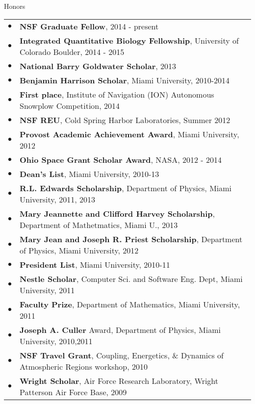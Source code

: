 \documentclass{resume} %
\begin{document}
\begin{rSection}{Honors}
  \begin{tabular}{ll}
    $\bullet$ & \textbf{NSF Graduate Fellow}, 2014 - present\\
    $\bullet$ & \textbf{Integrated Quantitative Biology Fellowship}, University of Colorado Boulder, 2014 - 2015\\
    $\bullet$ & \textbf{National Barry Goldwater Scholar}, 2013\\
    $\bullet$ & \textbf{Benjamin Harrison Scholar}, Miami University, 2010-2014\\
    $\bullet$ & \textbf{First place}, Institute of Navigation (ION) Autonomous Snowplow Competition, 2014\\
    $\bullet$ & \textbf{NSF REU}, Cold Spring Harbor Laboratories, Summer 2012\\
    $\bullet$ & \textbf{Provost Academic Achievement Award}, Miami University, 2012\\
    $\bullet$ & \textbf{Ohio Space Grant Scholar Award}, NASA, 2012 - 2014\\
    $\bullet$ & \textbf{Dean's List}, Miami University, 2010-13\\
    $\bullet$ & \textbf{R.L. Edwards Scholarship}, Department of Physics, Miami University, 2011, 2013\\
    $\bullet$ & \textbf{Mary Jeannette and Clifford Harvey Scholarship}, Department of Mathetmatics, Miami U., 2013\\
    $\bullet$ & \textbf{Mary Jean and Joseph R. Priest Scholarship}, Department of Physics, Miami University, 2012\\
    $\bullet$ & \textbf{President List}, Miami University, 2010-11\\
    $\bullet$ & \textbf{Nestle Scholar}, Computer Sci. and Software Eng. Dept, Miami University, 2011\\
    $\bullet$ & \textbf{Faculty Prize}, Department of Mathematics, Miami University, 2011\\
    $\bullet$ & \textbf{Joseph A. Culler} Award, Department of Physics, Miami University, 2010,2011\\
    $\bullet$ & \textbf{NSF Travel Grant}, Coupling, Energetics, \& Dynamics of Atmospheric Regions workshop, 2010\\
    $\bullet$ & \textbf{Wright Scholar}, Air Force Research Laboratory, Wright Patterson Air Force Base, 2009\\
  \end{tabular} \newpage
\end{rSection}
\end{document}
